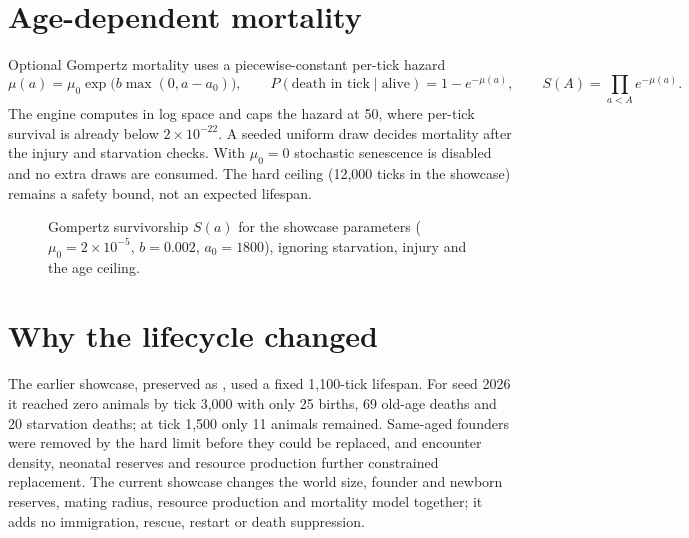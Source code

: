 \section{Age-dependent mortality}
Optional Gompertz mortality uses a piecewise-constant per-tick hazard
\[
\mu(a)=\mu_0\exp\big(b\max(0,a-a_0)\big),\qquad
P(\text{death in tick}\mid\text{alive})=1-e^{-\mu(a)},\qquad
S(A)=\prod_{a<A}e^{-\mu(a)}.
\]
The engine computes in log space and caps the hazard at 50, where per-tick
survival is already below $2\times10^{-22}$. A seeded uniform draw decides
mortality after the injury and starvation checks. With $\mu_0=0$ stochastic
senescence is disabled and no extra draws are consumed. The hard
 ceiling (12{,}000 ticks in the showcase) remains a safety
bound, not an expected lifespan.

\begin{figure}[htbp]
\centering
{}
\caption{Gompertz survivorship $S(a)$ for the showcase parameters
($\mu_0=2\times10^{-5}$, $b=0.002$, $a_0=1800$), ignoring starvation, injury and
the age ceiling.}
\end{figure}

\section{Why the lifecycle changed}
The earlier showcase, preserved as , used a
fixed 1{,}100-tick lifespan. For seed 2026 it reached zero animals by tick 3{,}000
with only 25 births, 69 old-age deaths and 20 starvation deaths; at tick 1{,}500
only 11 animals remained. Same-aged founders were removed by the hard limit before
they could be replaced, and encounter density, neonatal reserves and resource
production further constrained replacement. The current showcase changes the world
size, founder and newborn reserves, mating radius, resource production and
mortality model together; it adds no immigration, rescue, restart or death
suppression.

